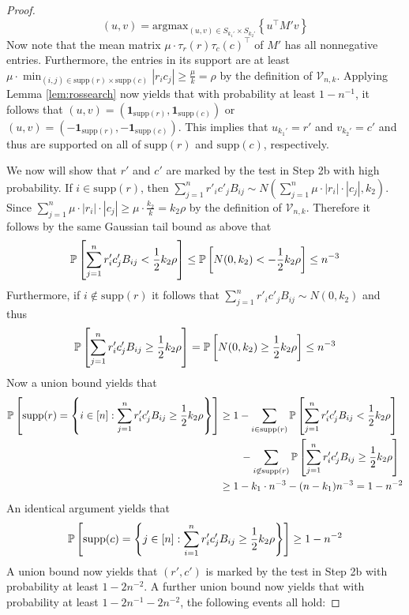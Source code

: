 \begin{proof}
$$(u, v) = \text{argmax}_{(u, v) \in S_{k_1'} \times S_{k_2'}} \left\{ u^\top M' v \right\}$$
Now note that the mean matrix $\mu \cdot \tau_r(r) \tau_c(c)^\top$ of $M'$ has all nonnegative entries. Furthermore, the entries in its support are at least $\mu \cdot \min_{(i, j) \in \text{supp}(r) \times \text{supp}(c)} |r_i c_j| \ge \frac{\mu}{k} = \rho$ by the definition of $\mathcal{V}_{n, k}$. Applying Lemma \ref{lem:rossearch} now yields that with probability at least $1 - n^{-1}$, it follows that $(u, v) = (\mathbf{1}_{\text{supp}(r)}, \mathbf{1}_{\text{supp}(c)})$ or $(u, v) = (-\mathbf{1}_{\text{supp}(r)}, -\mathbf{1}_{\text{supp}(c)})$. This implies that $u_{k_1'} = r'$ and $v_{k_2'} = c'$ and thus are supported on all of $\text{supp}(r)$ and $\text{supp}(c)$, respectively.

We now will show that $r'$ and $c'$ are marked by the test in Step 2b with high probability. If $i \in \text{supp}(r)$, then $\sum_{j = 1}^n r'_i c'_j B_{ij} \sim N\left( \sum_{j = 1}^n \mu \cdot |r_i| \cdot |c_j|, k_2 \right)$. Since $\sum_{j = 1}^n \mu \cdot |r_i| \cdot |c_j| \ge \mu \cdot \frac{k_2}{k} = k_2 \rho$ by the definition of $\mathcal{V}_{n, k}$. Therefore it follows by the same Gaussian tail bound as above that
$$\mathbb{P}\left[ \sum_{j = 1}^n r'_i c'_j B_{ij} < \frac{1}{2} k_2 \rho \right] \le \mathbb{P}\left[ N(0, k_2) < -\frac{1}{2} k_2 \rho \right] \le n^{-3}$$
Furthermore, if $i \not \in \text{supp}(r)$ it follows that $\sum_{j = 1}^n r'_i c'_j B_{ij} \sim N(0, k_2)$ and thus
$$\mathbb{P}\left[ \sum_{j = 1}^n r'_i c'_j B_{ij} \ge \frac{1}{2} k_2 \rho \right] = \mathbb{P}\left[ N(0, k_2) \ge \frac{1}{2} k_2 \rho \right] \le n^{-3}$$
Now a union bound yields that
\begin{align*}
\mathbb{P}\left[ \text{supp}(r) = \left\{ i \in [n] : \sum_{j = 1}^n r'_i c'_j B_{ij} \ge \frac{1}{2} k_2 \rho \right\} \right] &\ge 1 - \sum_{i \in \text{supp}(r)} \mathbb{P}\left[ \sum_{j = 1}^n r'_i c'_j B_{ij} < \frac{1}{2} k_2 \rho \right] \\
&\quad \quad - \sum_{i \not\in \text{supp}(r)} \mathbb{P}\left[ \sum_{j = 1}^n r'_i c'_j B_{ij} \ge \frac{1}{2} k_2 \rho \right] \\
&\ge 1 - k_1 \cdot n^{-3} - (n - k_1) n^{-3} = 1 - n^{-2}
\end{align*}
An identical argument yields that
$$\mathbb{P}\left[ \text{supp}(c) = \left\{ j \in [n] : \sum_{i = 1}^n r'_i c'_j B_{ij} \ge \frac{1}{2} k_2 \rho \right\} \right] \ge 1 - n^{-2}$$
A union bound now yields that $(r', c')$ is marked by the test in Step 2b with probability at least $1 - 2n^{-2}$. A further union bound now yields that with probability at least $1 - 2n^{-1} - 2n^{-2}$, the following events all hold:

\end{proof}
